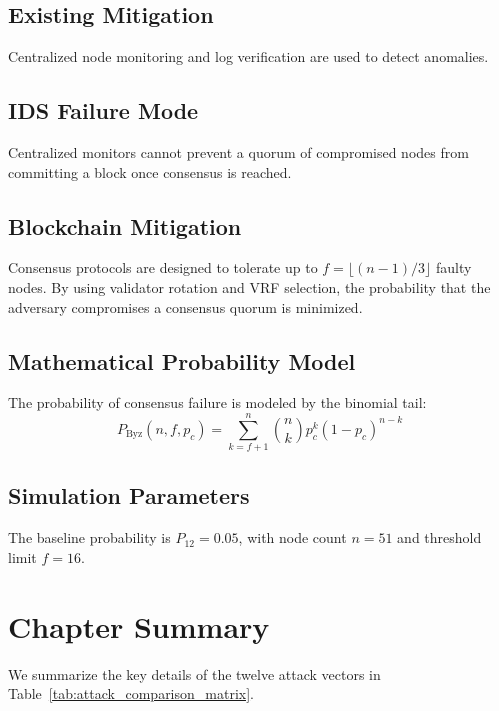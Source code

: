 \documentclass[12pt, oneside, a4paper]{report}
\theoremstyle{definition}
\theoremstyle{remark}
\newcommand{\Pbyz}{P_{\mathrm{Byz}}}
\begin{document}
\subsection{Existing Mitigation}
Centralized node monitoring and log verification are used to detect anomalies.

\subsection{IDS Failure Mode}
Centralized monitors cannot prevent a quorum of compromised nodes from committing a block once consensus is reached.

\subsection{Blockchain Mitigation}
Consensus protocols are designed to tolerate up to $f = \lfloor (n-1)/3 \rfloor$ faulty nodes. By using validator rotation and VRF selection, the probability that the adversary compromises a consensus quorum is minimized.

\subsection{Mathematical Probability Model}
The probability of consensus failure is modeled by the binomial tail:
\begin{equation}
\Pbyz(n, f, p_c) = \sum_{k=f+1}^{n} \binom{n}{k} p_c^k (1 - p_c)^{n - k}
\end{equation}

\subsection{Simulation Parameters}
The baseline probability is $P_{12} = 0.05$, with node count $n = 51$ and threshold limit $f = 16$.

\bigskip

\section{Chapter Summary}
\label{sec:tm:summary}

We summarize the key details of the twelve attack vectors in Table~\ref{tab:attack_comparison_matrix}.
\end{document}

